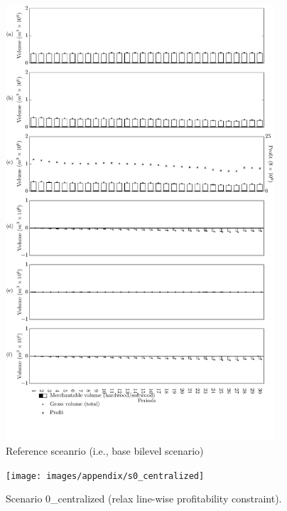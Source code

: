 \begin{figure}[h]
  \centering
  \includegraphics[width=10cm]{images/appendix/s6-1_p30a01}
  \caption{Reference sceanrio (i.e., base bilevel scenario)}
  \label{fig:s0_control}
\end{figure}

\begin{figure}[h]
  \centering
  \texttt{[image: images/appendix/s0\_centralized]}
  \caption{Scenario 0\_centralized (relax line-wise profitability constraint).}
  \label{fig:s0_centralized}
\end{figure}
